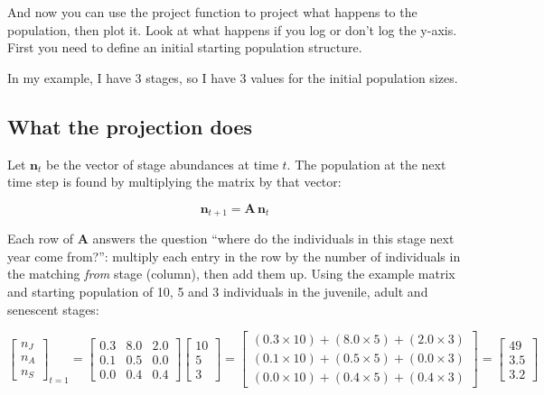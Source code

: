 \documentclass[
  a4paper]{book}
\begin{document}
And now you can use the project function to project what happens to the population, then plot it. Look at what happens if you log or don't log the y-axis. First you need to define an initial starting population structure.

In my example, I have 3 stages, so I have 3 values for the initial population sizes.

\subsection{What the projection does}\label{what-the-projection-does}

Let \(\mathbf{n}_t\) be the vector of stage abundances at time \(t\). The population at the next time step is found by multiplying the matrix by that vector:

\[
\mathbf{n}_{t+1} = \mathbf{A}\,\mathbf{n}_t
\]

Each row of \(\mathbf{A}\) answers the question ``where do the individuals in this stage next year come from?'': multiply each entry in the row by the number of individuals in the matching \emph{from} stage (column), then add them up. Using the example matrix and starting population of 10, 5 and 3 individuals in the juvenile, adult and senescent stages:

\[
\begin{bmatrix} n_J \\ n_A \\ n_S \end{bmatrix}_{t=1} =
\begin{bmatrix} 0.3 & 8.0 & 2.0 \\ 0.1 & 0.5 & 0.0 \\ 0.0 & 0.4 & 0.4 \end{bmatrix}
\begin{bmatrix} 10 \\ 5 \\ 3 \end{bmatrix} =
\begin{bmatrix}
(0.3 \times 10) + (8.0 \times 5) + (2.0 \times 3) \\
(0.1 \times 10) + (0.5 \times 5) + (0.0 \times 3) \\
(0.0 \times 10) + (0.4 \times 5) + (0.4 \times 3)
\end{bmatrix} =
\begin{bmatrix} 49 \\ 3.5 \\ 3.2 \end{bmatrix}
\]
\end{document}
